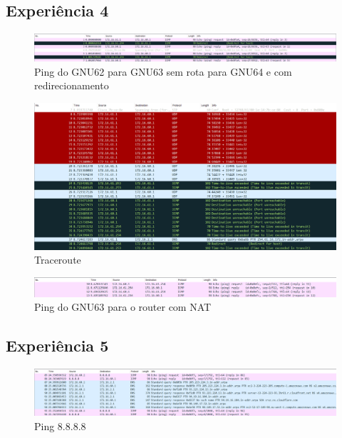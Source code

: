 \documentclass[article, a4paper, 11pt, oneside]{memoir}
\begin{document}
\newpage
\subsection{Experiência 4}
\begin{figure}[h]
	\centering
\includegraphics[scale=0.40]{exp4-step4-ping-gnu63-from-gnu62.png}
\caption{Ping do GNU62 para GNU63 sem rota para GNU64 e com redirecionamento}
\end{figure}

\begin{figure}[h]
	\centering
\includegraphics[scale=0.50]{exp4-traceroute.png}
\caption{Traceroute}
\end{figure}

\begin{figure}[h]
	\centering
\includegraphics[scale=0.43]{exp4-step7.png}
\caption{Ping do GNU63 para o router com NAT}
\end{figure}

\subsection{Experiência 5}
\begin{figure}[h]
	\centering
\includegraphics[scale=0.40]{exp5-step3.png}
\caption{Ping 8.8.8.8}
\end{figure}
\end{document}
